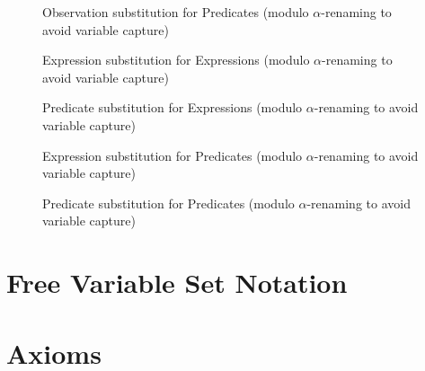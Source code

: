 \begin{figure}
  \caption{%
    Observation substitution for Predicates
     (modulo $\alpha$-renaming to avoid variable capture)
  }
  \label{fig:UTP2:obs-expr-Pred-subst}
\end{figure}

\begin{figure}
  \boxedm{
  \DEFEEESUBST
  }
  \caption{%
    Expression substitution for Expressions
     (modulo $\alpha$-renaming to avoid variable capture)
  }
  \label{fig:UTP2:expr-expr-Expr-subst}
\end{figure}

\begin{figure}
  \boxedm{
  \DEFPPESUBST
  }
  \caption{%
    Predicate substitution for Expressions
     (modulo $\alpha$-renaming to avoid variable capture)
  }
  \label{fig:UTP2:pred-pred-Expr-subst}
\end{figure}


\begin{figure}
  \caption{%
    Expression substitution for Predicates
     (modulo $\alpha$-renaming to avoid variable capture)
  }
  \label{fig:UTP2:expr-expr-Pred-subst}
\end{figure}

\begin{figure}
  \caption{%
    Predicate substitution for Predicates
     (modulo $\alpha$-renaming to avoid variable capture)
  }
  \label{fig:UTP2:pred-pred-Pred-subst}
\end{figure}

\newpage
\section{Free Variable Set Notation}



\newpage
\section{Axioms}

